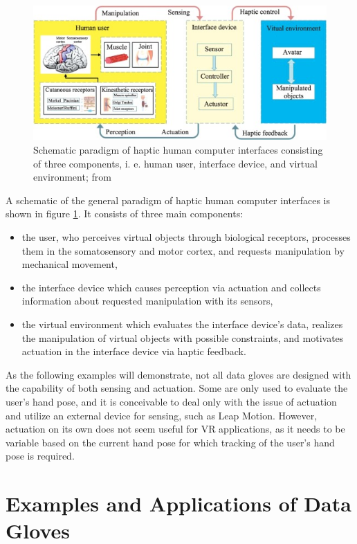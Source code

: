 \documentclass[hyperref, bachelorofscience]{cgvpub}
\begin{document}
\begin{figure}
	\centering
	\includegraphics[width=.8\linewidth]{../pics/wang01}
	\caption[Schematic paradigm of haptic human computer interfaces]{Schematic paradigm of haptic human computer interfaces consisting of three components, i. e. human user, interface device, and virtual environment; from \cite{wang19}}
	\label{fig:hci}
\end{figure}

A schematic of the general paradigm of haptic human computer interfaces is shown in figure \ref{fig:hci}. It consists of three main components:
\begin{itemize}
	\item the user, who perceives virtual objects through biological receptors, processes them in the somatosensory and motor cortex, and requests manipulation by mechanical movement,
	\item the interface device which causes perception via actuation and collects information about requested manipulation with its sensors,
	\item the virtual environment which evaluates the interface device's data, realizes the manipulation of virtual objects with possible constraints, and motivates actuation in the interface device via haptic feedback.
\end{itemize}

As the following examples will demonstrate, not all data gloves are designed with the capability of both sensing and actuation. Some are only used to evaluate the user's hand pose, and it is conceivable to deal only with the issue of actuation and utilize an external device for sensing, such as Leap Motion. However, actuation on its own does not seem useful for VR applications, as it needs to be variable based on the current hand pose for which tracking of the user's hand pose is required.

\section{Examples and Applications of Data Gloves}
\end{document}
